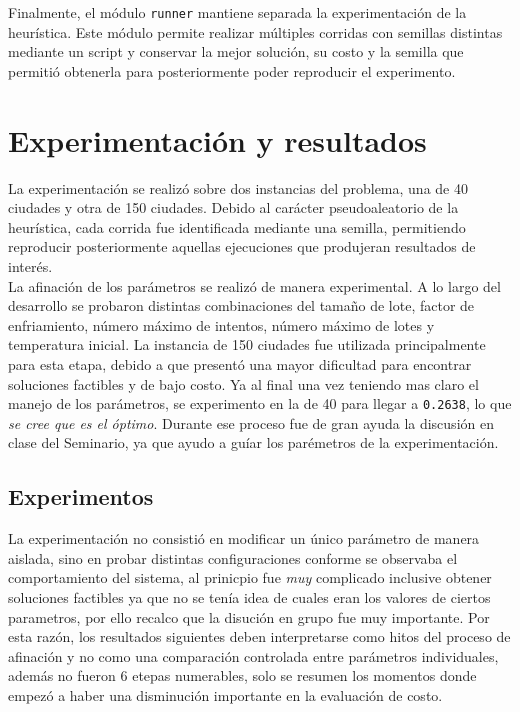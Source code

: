 \documentclass[twoside,11pt]{article}
\begin{document}
Finalmente, el módulo \texttt{runner} mantiene separada la experimentación de la heurística. Este módulo permite realizar múltiples corridas con semillas distintas mediante un script y conservar la mejor solución, su costo y la semilla que permitió obtenerla para posteriormente poder reproducir el experimento.

\section{Experimentación y resultados}

La experimentación se realizó sobre dos instancias del problema, una de 40 ciudades y otra de 150 ciudades. Debido al carácter pseudoaleatorio de la heurística, cada corrida fue identificada mediante una semilla, permitiendo reproducir posteriormente aquellas ejecuciones que produjeran resultados de interés.\\

La afinación de los parámetros se realizó de manera experimental. A lo largo del desarrollo se probaron distintas combinaciones del tamaño de lote, factor
de enfriamiento, número máximo de intentos, número máximo de lotes y temperatura inicial. La instancia de 150 ciudades fue utilizada principalmente para esta etapa, debido a que presentó una mayor dificultad para encontrar soluciones factibles y de bajo costo. Ya al final una vez teniendo mas claro el manejo de los parámetros, se experimento en la de 40 para llegar a \texttt{0.2638}, lo que \textit{se cree que es el óptimo}.  Durante ese proceso fue de gran ayuda la discusión en clase del Seminario, ya que ayudo a guíar los parémetros de la experimentación. 


\subsection{Experimentos}

La experimentación no consistió en modificar un único parámetro de manera aislada, sino en probar distintas configuraciones conforme se observaba el comportamiento del sistema, al prinicpio fue \textit{muy} complicado inclusive obtener soluciones factibles ya que no se tenía idea de cuales eran los valores de ciertos parametros, por ello recalco que la disución en grupo fue muy importante. Por esta razón, los resultados siguientes deben interpretarse como hitos del proceso de afinación y no como una comparación controlada entre parámetros individuales, además no fueron 6 etepas numerables, solo se resumen los momentos donde empezó a haber una disminución importante en la evaluación de costo.\\
\end{document}
